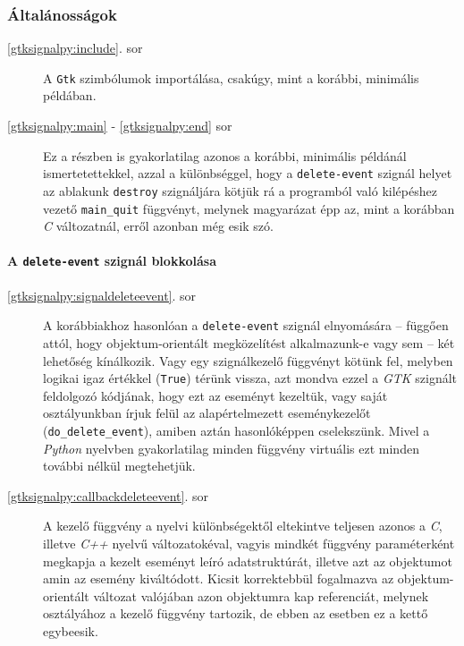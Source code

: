 \subsubsection{Általánosságok}

\begin{description}
 \item[\ref{gtksignalpy:include}. sor] A \texttt{Gtk} szimbólumok importálása, csakúgy, mint a korábbi, minimális példában.

 \item[\ref{gtksignalpy:main} - \ref{gtksignalpy:end} sor] Ez a részben is gyakorlatilag azonos a korábbi, minimális példánál ismertetettekkel, azzal a különbséggel, hogy a \texttt{delete-event} szignál helyet az ablakunk \texttt{destroy} szignáljára kötjük rá a programból való kilépéshez vezető \texttt{main\_quit} függvényt, melynek magyarázat épp az, mint a korábban \textit{C} változatnál, erről azonban még esik szó.

\end{description}

\paragraph{A \texttt{delete-event} szignál blokkolása}

\begin{description}
 \item[\ref{gtksignalpy:signaldeleteevent}. sor] A korábbiakhoz hasonlóan a \texttt{delete-event} szignál elnyomására -- függően attól, hogy objektum-orientált megközelítést alkalmazunk-e vagy sem -- két lehetőség kínálkozik. Vagy egy szignálkezelő függvényt kötünk fel, melyben logikai igaz értékkel (\texttt{True}) térünk vissza, azt mondva ezzel a \textit{GTK} szignált feldolgozó kódjának, hogy ezt az eseményt kezeltük, vagy saját osztályunkban írjuk felül az alapértelmezett eseménykezelőt (\texttt{do\_delete\_event}), amiben aztán hasonlóképpen cselekszünk. Mivel a \textit{Python} nyelvben gyakorlatilag minden függvény virtuális ezt minden további nélkül megtehetjük.

 \item[\ref{gtksignalpy:callbackdeleteevent}. sor] A kezelő függvény a nyelvi különbségektől eltekintve teljesen azonos a \textit{C}, illetve \textit{C++} nyelvű változatokéval, vagyis mindkét függvény paraméterként megkapja a kezelt eseményt leíró adatstruktúrát, illetve azt az objektumot amin az esemény kiváltódott. Kicsit korrektebbül fogalmazva az objektum-orientált változat valójában azon objektumra kap referenciát, melynek osztályához a kezelő függvény tartozik, de ebben az esetben ez a kettő egybeesik.
\end{description}

